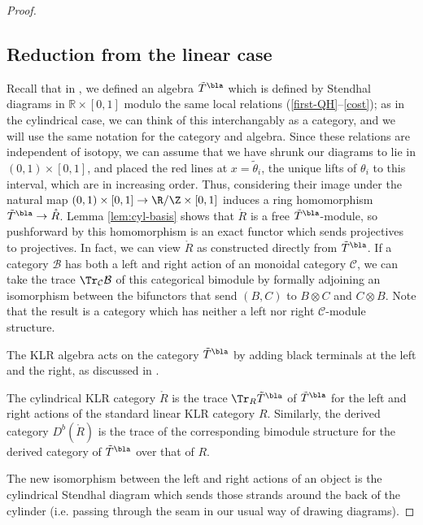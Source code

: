 \begin{proof}
\subsection{Reduction from the linear case}
\label{sec:reduct-from-line}
Recall that in \cite[\S 4]{Webmerged}, we defined an algebra $\tilde{T}^{\bla}$ which is defined by Stendhal diagrams in $\mathbb{R}\times [0,1]$ modulo the same local relations (\ref{first-QH}--\ref{cost}); as in the cylindrical case, we can think of this interchangably as a category, and we will use the same notation for the category and algebra.  Since these relations are independent of isotopy, we can assume that we have shrunk our diagrams to lie in $(0,1)\times [0,1]$, and placed the red lines at $x=\tilde{\theta}_i$, the unique lifts of $\theta_i$ to this interval, which are in increasing order.  Thus, considering their image under the natural map $ (0,1)\times [0,1]\to \R/\Z\times [0,1]$ induces a ring homomorphism $\tilde{T}^{\bla}\to \mathring{R}$.  
Lemma \ref{lem:cyl-basis} shows that $\mathring{R}$ is a free $\tilde{T}^{\bla}$-module, so pushforward by this homomorphism is an exact functor which sends projectives to projectives.  In fact, we can view $\mathring{R}$ as constructed directly from $\tilde{T}^{\bla}$.  If a category $\mathcal{B}$ has both a left and right action of an monoidal category $\mathcal{C}$, we can take the trace $\Tr_{\mathcal{C}}\mathcal{B}$ of this categorical bimodule by formally adjoining an isomorphism between the bifunctors that send $(B,C)$ to $B\otimes C$ and $C\otimes B$.  Note that the result is a category which has neither a left nor right $ \mathcal{C}$-module structure.

The KLR algebra acts on the category $\tilde{T}^{\bla}$ by adding black terminals at the left and the right, as discussed in \cite[\S 2.2.3]{Webweb}.
\begin{proposition}
The cylindrical KLR category $\mathring{R}$ is the trace $\Tr_{R}\tilde{T}^{\bla}$ of $\tilde{T}^{\bla}$ for the left and right actions of the standard linear KLR category $R$.  Similarly, the derived category $D^b(\mathring{R})$ is the trace of the corresponding bimodule structure for the derived category of $\tilde{T}^{\bla}$ over that of $R$. 
\end{proposition}
 The new isomorphism between the left and right actions of an object is the cylindrical Stendhal diagram which sends those strands around the back of the cylinder (i.e. passing through the seam in our usual way of drawing diagrams).  



\end{proof}
